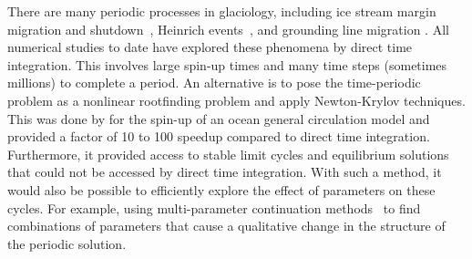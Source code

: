 There are many periodic processes in glaciology, including ice stream margin migration and shutdown~\citep{raymond2000energy,bueler2009shallow}, Heinrich events~\citep{heinrich1988cyclic,calov2010heino}, and grounding line migration \citep{schoof2007isg,mismip}.
All numerical studies to date have explored these phenomena by direct time integration.
This involves large spin-up times and many time steps (sometimes millions) to complete a period.
An alternative is to pose the time-periodic problem as a nonlinear rootfinding problem and apply Newton-Krylov techniques.
This was done by \citep{merlis2008fast} for the spin-up of an ocean general circulation model and provided a factor of 10 to 100 speedup compared to direct time integration.
Furthermore, it provided access to stable limit cycles and equilibrium solutions that could not be accessed by direct time integration.
With such a method, it would also be possible to efficiently explore the effect of parameters on these cycles.
For example, using multi-parameter continuation methods~\citep{allgower2003inc} to find combinations of parameters that cause a qualitative change in the structure of the periodic solution.



